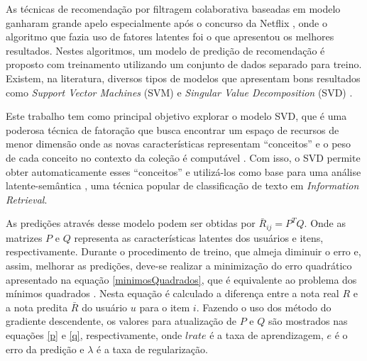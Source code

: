 \documentclass[12pt]{article}
\begin{document}

As técnicas de recomendação por filtragem colaborativa baseadas em modelo ganharam grande apelo especialmente após o concurso da Netflix \cite{bennett2007netflix}, onde o algoritmo que fazia uso de fatores latentes \cite{koren2009matrix} foi o que apresentou os melhores resultados. Nestes algoritmos, um modelo de predição de recomendação é proposto com treinamento utilizando um conjunto de dados separado para treino. Existem, na literatura, diversos tipos de modelos que apresentam bons resultados como \textit{Support Vector Machines} (SVM) \cite{grvcar2006knn} e \textit{Singular Value Decomposition} (SVD) \cite{takacs2009scalable}. 

Este trabalho tem como principal objetivo explorar o modelo SVD, que é uma poderosa técnica de fatoração que busca encontrar um espaço de recursos de menor dimensão onde as novas características representam ``conceitos'' e o peso de cada conceito no contexto da coleção é computável \cite{shapira2011recommender}. Com isso, o SVD permite obter automaticamente esses ``conceitos'' e utilizá-los como base para uma análise latente-semântica \cite{shapira2011recommender}, uma técnica popular de classificação de texto em \textit{Information Retrieval}.

As predições através desse modelo podem ser obtidas por $\bar{R}_{ij} = P^TQ$. Onde as matrizes $P$ e $Q$ representa as características latentes dos usuários e itens, respectivamente. Durante o procedimento de treino, que almeja diminuir o erro e, assim, melhorar as predições, deve-se realizar a minimização do erro quadrático apresentado na equação \ref{minimosQuadrados}, que é equivalente ao problema dos mínimos quadrados \cite{helene2006metodos}. Nesta equação é calculado a diferença entre a nota real $R$ e a nota predita $\bar{R}$ do usuário $u$ para o item $i$. Fazendo o uso dos método do gradiente descendente, os valores para atualização de $P$ e $Q$ são mostrados nas equações \ref{p} e \ref{q}, respectivamente, onde $lrate$ é a taxa de aprendizagem, $e$ é o erro da predição e $\lambda$ é a taxa de regularização.
\end{document}
